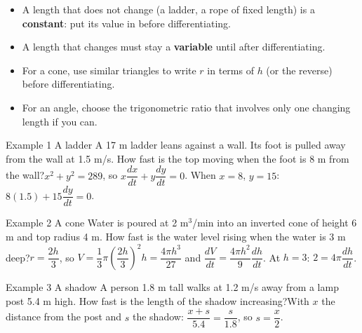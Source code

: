 \documentclass[11pt]{article}
\begin{document}

\begin{ideabox}
\begin{itemize}[leftmargin=*,itemsep=2pt,topsep=2pt]
  \item A length that does not change (a ladder, a rope of fixed length) is a \textbf{constant}: put its value in before differentiating.
  \item A length that changes must stay a \textbf{variable} until after differentiating.
  \item For a cone, use similar triangles to write $r$ in terms of $h$ (or the reverse) before differentiating.
  \item For an angle, choose the trigonometric ratio that involves only one changing length if you can.
\end{itemize}
\end{ideabox}

\begin{example}{Example 1 \textperiodcentered{} A ladder}
A 17 m ladder leans against a wall. Its foot is pulled away from the wall at 1.5 m/s. How fast is the top moving when the foot is 8 m from the wall?\soln $x^2+y^2=289$, so $x\dfrac{dx}{dt}+y\dfrac{dy}{dt}=0$. When $x=8$, $y=15$: $8(1.5)+15\dfrac{dy}{dt}=0$.
\end{example}

\begin{example}{Example 2 \textperiodcentered{} A cone}
Water is poured at 2 m$^3$/min into an inverted cone of height 6 m and top radius 4 m. How fast is the water level rising when the water is 3 m deep?\soln $r=\dfrac{2h}{3}$, so $V=\dfrac13\pi\left(\dfrac{2h}{3}\right)^2h=\dfrac{4\pi h^3}{27}$ and $\dfrac{dV}{dt}=\dfrac{4\pi h^2}{9}\dfrac{dh}{dt}$. At $h=3$: $2=4\pi\dfrac{dh}{dt}$.
\end{example}

\begin{example}{Example 3 \textperiodcentered{} A shadow}
A person 1.8 m tall walks at 1.2 m/s away from a lamp post 5.4 m high. How fast is the length of the shadow increasing?\soln With $x$ the distance from the post and $s$ the shadow: $\dfrac{x+s}{5.4}=\dfrac{s}{1.8}$, so $s=\dfrac x2$.
\end{example}

\newpage
{}
\end{document}

